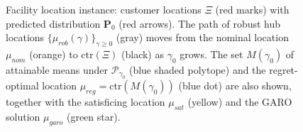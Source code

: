 \documentclass{article}
\begin{document}
\begin{figure}[h]
  \caption{Facility location instance: customer locations $\Xi$ (red marks) with predicted distribution $\mathbf{P}_0$ (red arrows). The path of robust hub locations $\{\mu_{rob}(\gamma)\}_{\gamma\geq 0}$ (gray) moves from the nominal location $\mu_{nom}$ (orange) to $\mathrm{ctr}(\Xi)$ (black) as $\gamma_0$ grows. The set $M(\gamma_0)$ of attainable means under $\mathcal{P}_{\gamma_0}$ (blue shaded polytope) and the regret-optimal location $\mu_{reg}=\mathrm{ctr}(M(\gamma_0))$ (blue dot) are also shown, together with the satisficing location $\mu_{sat}$ (yellow) and the GARO solution $\mu_{garo}$ (green star).}
  \label{fig:weber-instance}
\end{figure}

\clearpage
\end{document}

